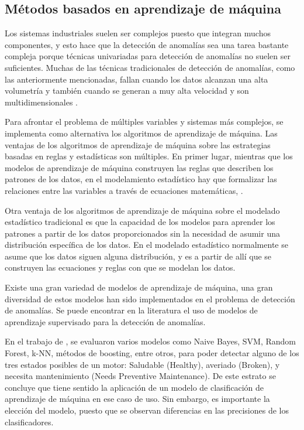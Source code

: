 \documentclass[11pt,a4paper,spanish]{book}
\numberwithin{equation}{chapter}
\numberwithin{figure}{chapter}
\begin{document}
\subsection{Métodos basados en aprendizaje de máquina}


Los sistemas industriales suelen ser complejos puesto que integran muchos componentes, y esto hace que la detección de anomalías sea una tarea bastante compleja porque técnicas univariadas para detección de anomalías no suelen ser suficientes. Muchas de las técnicas tradicionales de detección de anomalías, como las anteriormente mencionadas, fallan cuando los datos alcanzan una alta volumetría y también cuando se generan a muy alta velocidad y son multidimensionales \cite{thudumu2020survey}.


Para afrontar el problema de múltiples variables y sistemas más complejos, se implementa como alternativa los algoritmos de aprendizaje de máquina. Las ventajas de los algoritmos de aprendizaje de máquina sobre las estrategias basadas en reglas y estadísticas son múltiples. En primer lugar, mientras que los modelos de aprendizaje de máquina construyen las reglas que describen los patrones de los datos, en el modelamiento estadístico hay que formalizar las relaciones entre las variables a través de ecuaciones matemáticas, \cite{ij2018statvsml}. 


Otra ventaja de los algoritmos de aprendizaje de máquina sobre el modelado estadístico tradicional es que la capacidad de los modelos para aprender los patrones a partir de los datos proporcionados sin la necesidad de asumir una distribución específica de los datos. En el modelado estadístico normalmente se asume que los datos siguen alguna distribución, y es a partir de allí que se construyen las ecuaciones y reglas con que se modelan los datos. 


Existe una gran variedad de modelos de aprendizaje de máquina, una gran diversidad de estos modelos han sido implementados en el problema de detección de anomalías. Se puede encontrar en la literatura el uso de modelos de aprendizaje supervisado para la detección de anomalías. 


En el trabajo de \cite{baradaran2025predictivemaintenanceelectricmotors}, se  evaluaron varios modelos como Naive Bayes, SVM, Random Forest, k-NN, métodos de boosting, entre otros, para poder detectar alguno de los tres estados posibles de un motor: Saludable (Healthy), averiado (Broken), y necesita mantenimiento (Needs Preventive Maintenance). De este estrato se concluye que tiene sentido la aplicación de un modelo de clasificación de aprendizaje de máquina en ese caso de uso. Sin embargo, es importante la elección del modelo, puesto que se observan diferencias en las precisiones de los clasificadores.   
\end{document}

